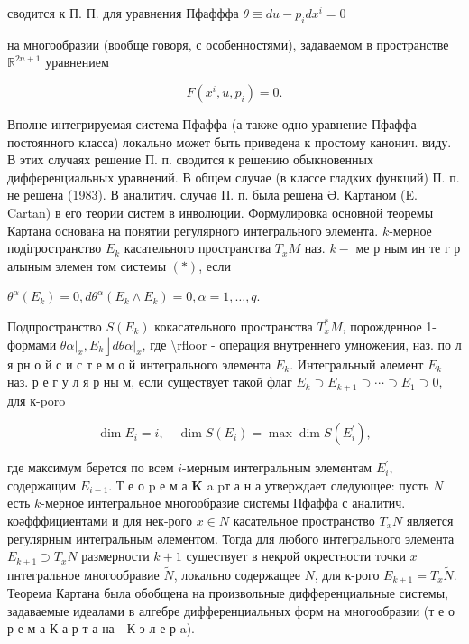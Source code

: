 \documentclass[10pt]{article}
\begin{document}
сводится к П. П. для уравнения Пфафффа $\theta \equiv d u-p_{i} d x^{i}=0$

на многообразии (вообще говоря, с особенностями), задаваемом в пространстве $\mathbb{R}^{2 n+1}$ уравнением



\[

F\left(x^{i}, u, p_{i}\right)=0 .

\]



Вполне интегрируемая система Пфаффа (а также одно уравнение Пфаффа постоянного класса) локально может быть приведена к простому канонич. виду. В этих случаях решение П. п. сводится к решению обыкновенных дифференциальных уравнений. В общем случае (в классе гладких функций) П. п. не решена (1983). В аналитич. случаө П. п. была решена Ә. Картаном (E. Cartan) в его теории систем в инволюции. Формулировка основной теоремы Картана основана на понятии регулярного интегрального элемента. $k$-мерное подігространство $E_{k}$ касательного пространства $T_{x} M$ наз. $k-$ ме р ным ин те г р алыным элемен том системы $(*)$, если



$\theta^{\alpha}\left(E_{k}\right)=0, d \theta^{\alpha}\left(E_{k} \wedge E_{k}\right)=0, \alpha=1, \ldots, q$.



Подпространство $S\left(E_{k}\right)$ кокасательного пространства $T_{x}^{*} M$, порожденное 1-формами $\left.\left.\theta \alpha\right|_{x}, E_{k}\right\rfloor\left. d \theta \alpha\right|_{x}$, где \textbackslash rfloor - операция внутреннего умножения, наз. по л я рн о й с и с т е м о й интегрального элемента $E_{k}$. Интегральный әлемент $E_{k}$ наз. р е г у л я р ны м, если существует такой флаг $E_{k} \supset E_{k+1} \supset \cdots \supset E_{1} \supset 0$, для к-poro



\[

\operatorname{dim} E_{i}=i, \quad \operatorname{dim} S\left(E_{i}\right)=\max \operatorname{dim} S\left(E_{i}^{\prime}\right),

\]



где максимум берется по всем $i$-мерным интегральным элементам $E_{i}^{\prime}$, содержащим $E_{i-1}$. Т е о $\mathrm{p}$ е м а $\mathbf{K}$ a pт а н а утверждает следующее: пусть $N$ есть $k$-мерное интегральное многообразие системы Пфаффа с аналитич. коәфффициентами и для нек-рого $x \in N$ касательное пространство $T_{x} N$ является регулярным интегральным әлементом. Тогда для любого интегрального элемента $E_{k+1} \supset T_{x} N$ размерности $k+1$ существует в некрой окрестности точки $x$ пнтегральное многообравие $\tilde{N}$, локально содержащее $N$, для к-рого $E_{k+1}=T_{x} \tilde{N}$. Теорема Картана была обобщена на произвольные дифференциальные системы, задаваемые идеалами в алгебре дифференциальных форм на многообразии (т е о р е м а К а р т а на - К э л е р a).
\end{document}
